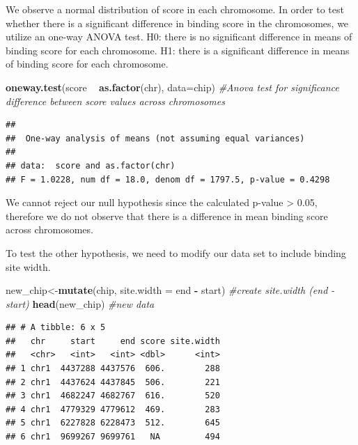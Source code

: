 \documentclass[]{article}
\newenvironment{Shaded}{\begin{snugshade}}{\end{snugshade}}
\newcommand{\KeywordTok}[1]{\textcolor[rgb]{0.13,0.29,0.53}{\textbf{#1}}}
\newcommand{\DataTypeTok}[1]{\textcolor[rgb]{0.13,0.29,0.53}{#1}}
\newcommand{\StringTok}[1]{\textcolor[rgb]{0.31,0.60,0.02}{#1}}
\newcommand{\CommentTok}[1]{\textcolor[rgb]{0.56,0.35,0.01}{\textit{#1}}}
\newcommand{\OperatorTok}[1]{\textcolor[rgb]{0.81,0.36,0.00}{\textbf{#1}}}
\newcommand{\NormalTok}[1]{#1}
\begin{document}
We observe a normal distribution of score in each chromosome. In order
to test whether there is a significant difference in binding score in
the chromosomes, we utilize an one-way ANOVA test. H0: there is no
significant difference in means of binding score for each chromosome.
H1: there is a significant difference in means of binding score for each
chromosome.

\begin{Shaded}
\begin{Highlighting}[]
\KeywordTok{oneway.test}\NormalTok{(score }\OperatorTok{~}\StringTok{ }\KeywordTok{as.factor}\NormalTok{(chr), }\DataTypeTok{data=}\NormalTok{chip) }\CommentTok{#Anova test for significance difference between score values across chromosomes}
\end{Highlighting}
\end{Shaded}

\begin{verbatim}
## 
##  One-way analysis of means (not assuming equal variances)
## 
## data:  score and as.factor(chr)
## F = 1.0228, num df = 18.0, denom df = 1797.5, p-value = 0.4298
\end{verbatim}

We cannot reject our null hypothesis since the calculated p-value
\textgreater{} 0.05, therefore we do not observe that there is a
difference in mean binding score across chromosomes.

To test the other hypothesis, we need to modify our data set to include
binding site width.

\begin{Shaded}
\begin{Highlighting}[]
\NormalTok{new_chip<-}\KeywordTok{mutate}\NormalTok{(chip, }\DataTypeTok{site.width =}\NormalTok{ end }\OperatorTok{-}\StringTok{ }\NormalTok{start) }\CommentTok{#create site.width (end - start)}
\KeywordTok{head}\NormalTok{(new_chip) }\CommentTok{#new data}
\end{Highlighting}
\end{Shaded}

\begin{verbatim}
## # A tibble: 6 x 5
##   chr     start     end score site.width
##   <chr>   <int>   <int> <dbl>      <int>
## 1 chr1  4437288 4437576  606.        288
## 2 chr1  4437624 4437845  506.        221
## 3 chr1  4682247 4682767  616.        520
## 4 chr1  4779329 4779612  469.        283
## 5 chr1  6227828 6228473  512.        645
## 6 chr1  9699267 9699761   NA         494
\end{verbatim}
\end{document}
